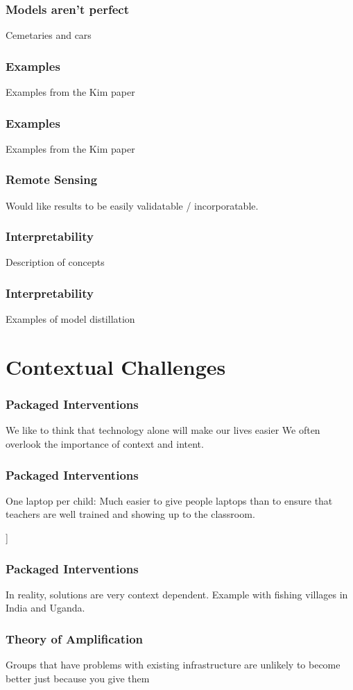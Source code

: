 \documentclass[10pt,mathserif]{beamer}
\begin{document}
\begin{frame}
  \frametitle{Models aren't perfect}
 Cemetaries and cars 
\end{frame}

\begin{frame}
  \frametitle{Examples}
  Examples from the Kim paper
\end{frame}

\begin{frame}
  \frametitle{Examples}
  Examples from the Kim paper
\end{frame}

\begin{frame}
  \frametitle{Remote Sensing}
  Would like results to be easily validatable / incorporatable.
\end{frame}

\begin{frame}
  \frametitle{Interpretability}
  Description of concepts
\end{frame}

\begin{frame}
  \frametitle{Interpretability}
  Examples of model distillation
\end{frame}

\section{Contextual Challenges}
\label{sec:label}

\begin{frame}
  \frametitle{Packaged Interventions}
  We like to think that technology alone will make our lives easier
  We often overlook the importance of context and intent.
\end{frame}

\begin{frame}
  \frametitle{Packaged Interventions}
  One laptop per child: Much easier to give people laptops than to ensure that
  teachers are well trained and showing up to the classroom.
\end{frame}

\begin{frame}]
  \frametitle{Packaged Interventions}
  In reality, solutions are very context dependent.
  Example with fishing villages in India and Uganda.
\end{frame}

\begin{frame}
  \frametitle{Theory of Amplification}
  Groups that have problems with existing infrastructure are unlikely to become
  better just because you give them
\end{frame}
\end{document}
